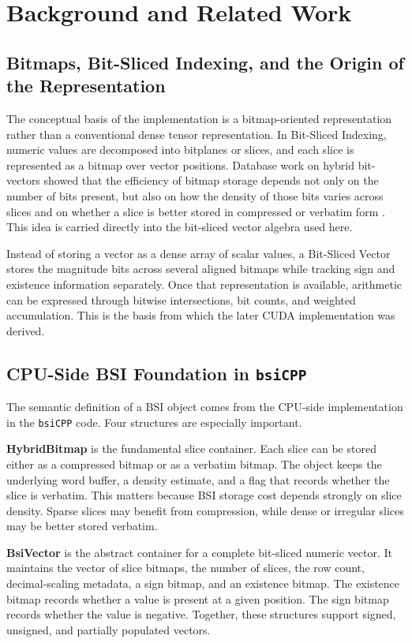 \section{Background and Related Work}\label{sec:background}
\subsection{Bitmaps, Bit-Sliced Indexing, and the Origin of the Representation}
The conceptual basis of the implementation is a bitmap-oriented representation rather than a conventional dense tensor representation. In Bit-Sliced Indexing, numeric values are decomposed into bitplanes or slices, and each slice is represented as a bitmap over vector positions. Database work on hybrid bit-vectors showed that the efficiency of bitmap storage depends not only on the number of bits present, but also on how the density of those bits varies across slices and on whether a slice is better stored in compressed or verbatim form \cite{hybridbitmap}. This idea is carried directly into the bit-sliced vector algebra used here.

Instead of storing a vector as a dense array of scalar values, a Bit-Sliced Vector stores the magnitude bits across several aligned bitmaps while tracking sign and existence information separately. Once that representation is available, arithmetic can be expressed through bitwise intersections, bit counts, and weighted accumulation. This is the basis from which the later CUDA implementation was derived.

\subsection{CPU-Side BSI Foundation in \texttt{bsiCPP}}
The semantic definition of a BSI object comes from the CPU-side implementation in the \texttt{bsiCPP} code. Four structures are especially important.

\textbf{HybridBitmap} is the fundamental slice container. Each slice can be stored either as a compressed bitmap or as a verbatim bitmap. The object keeps the underlying word buffer, a density estimate, and a flag that records whether the slice is verbatim. This matters because BSI storage cost depends strongly on slice density. Sparse slices may benefit from compression, while dense or irregular slices may be better stored verbatim.

\textbf{BsiVector} is the abstract container for a complete bit-sliced numeric vector. It maintains the vector of slice bitmaps, the number of slices, the row count, decimal-scaling metadata, a sign bitmap, and an existence bitmap. The existence bitmap records whether a value is present at a given position. The sign bitmap records whether the value is negative. Together, these structures support signed, unsigned, and partially populated vectors.

